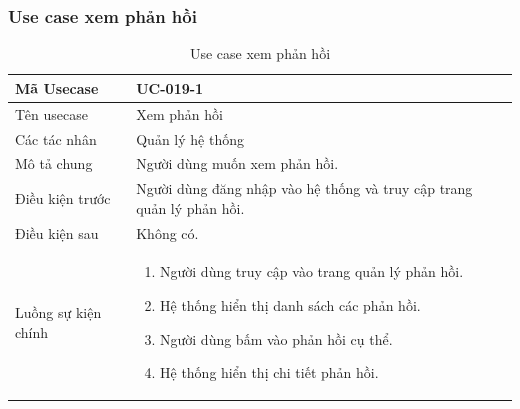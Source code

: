 \documentclass[12pt,a4paper]{article}
\begin{document}
    \subsubsection*{Use case xem phản hồi}
    \begin{table}[H]
        \centering
        \begin{tabular}{|p{3.5cm}|p{11.5cm}|c|}
            \hline
            Mã Usecase      & UC-019-1                                                              \\
            \hline
            Tên usecase     & Xem phản hồi                                                          \\
            \hline
            Các tác nhân    & Quản lý hệ thống                                                      \\
            \hline
            Mô tả chung     & Người dùng muốn xem phản hồi.                                         \\
            \hline

            Điều kiện trước & Người dùng đăng nhập vào hệ thống và truy cập trang quản lý phản hồi. \\
            \hline

            Điều kiện sau   & Không có.                                                             \\
            \hline

            Luồng sự kiện chính & \vspace{-.8cm}\begin{enumerate}
                                                    \item Người dùng truy cập vào trang quản lý phản hồi.
                                                    \item Hệ thống hiển thị danh sách các phản hồi.
                                                    \item Người dùng bấm vào phản hồi cụ thể.
                                                    \item Hệ thống hiển thị chi tiết phản hồi.
            \end{enumerate}
            \\
            \hline
        \end{tabular}
        \caption{Use case xem phản hồi}

    \end{table}


\end{document}
